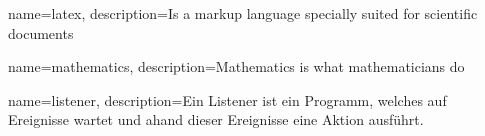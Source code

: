 \usepackage{glossaries}
\usepackage[automake]{glossaries-extra}
\makeglossaries

{
  name=latex,
  description={Is a markup language specially suited for scientific documents}
}

{
  name=mathematics,
  description={Mathematics is what mathematicians do}
}

{
  name=listener,
  description={Ein Listener ist ein Programm, welches auf Ereignisse wartet und ahand dieser Ereignisse eine Aktion ausführt.}
}